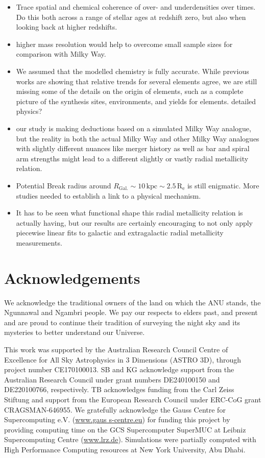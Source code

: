 \documentclass[fleqn,usenatbib]{mnras}
\begin{document}
\begin{itemize}
    \item Trace spatial and chemical coherence of over- and underdensities over times. Do this both across a range of stellar ages at redshift zero, but also when looking back at higher redshifts.
    \item higher mass resolution would help to overcome small sample sizes for comparison with Milky Way.
    \item We assumed that the modelled chemistry is fully accurate. While previous works are showing that relative trends for several elements agree, we are still missing some of the details on the origin of elements, such as a complete picture of the synthesis sites, environments, and yields for elements. detailed physics?
    \item our study is making deductions based on a simulated Milky Way analogue, but the reality in both the actual Milky Way and other Milky Way analogues with slightly different nuances like merger history as well as bar and spiral arm strengths might lead to a different slightly or vastly radial metallicity relation.
    \item Potential Break radius around $R_\mathrm{Gal.} \sim 10\,\mathrm{kpc} \sim 2.5\,\mathrm{R_e}$ is still enigmatic. More studies needed to establish a link to a physical mechanism.
    \item It has to be seen what functional shape this radial metallicity relation is actually having, but our results are certainly encouraging to not only apply piecewise linear fits to galactic and extragalactic radial metallicity measurements.
\end{itemize}

\section*{Acknowledgements}

We acknowledge the traditional owners of the land on which the ANU stands, the Ngunnawal and Ngambri people. We pay our respects to elders past, and present and are proud to continue their tradition of surveying the night sky and its mysteries to better understand our Universe.

This work was supported by the Australian Research Council Centre of Excellence for All Sky Astrophysics in 3 Dimensions (ASTRO 3D), through project number CE170100013. SB and KG acknowledge support from the Australian Research Council under grant numbers DE240100150 and DE220100766, respectively. TB acknowledges funding from the Carl Zeiss Stiftung and support from the European Research Council under ERC-CoG grant CRAGSMAN-646955. We gratefully acknowledge the Gauss Centre for Supercomputing e.V. (\url{www.gaus s-centre.eu}) for funding this project by providing computing time on the GCS Supercomputer SuperMUC at Leibniz Supercomputing Centre (\url{www.lrz.de}). Simulations were partially computed with High Performance Computing resources at New York University, Abu Dhabi.
\end{document}
